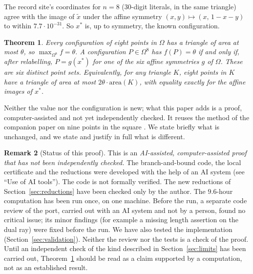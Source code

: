 \documentclass[11pt]{amsart}
\newtheorem{theorem}{Theorem}[section]
\theoremstyle{definition}
\newtheorem{remark}[theorem]{Remark}
\newcommand{\Om}{\Omega}
\begin{document}
The record site's coordinates for $n = 8$ (30-digit literals, in the same triangle) agree with the image of $\tilde x$ under the affine symmetry $(x,y)\mapsto(x,\,1-x-y)$ to within $7.7\cdot10^{-31}$. So $x^*$ is, up to symmetry, the known configuration. %

\begin{theorem}\label{thm:main}
Every configuration of eight points in $\Om$ has a triangle of area at most $\theta$, so $\max_{\Om^8} f = \theta$. A configuration $P \in \Om^8$ has $f(P) = \theta$ if and only if, after relabelling, $P = g(x^*)$ for one of the six affine symmetries $g$ of $\Om$. These are six distinct point sets. Equivalently, for any triangle $K$, eight points in $K$ have a triangle of area at most $2\theta\cdot\mathrm{area}(K)$, with equality exactly for the affine images of $x^*$.
\end{theorem}

Neither the value nor the configuration is new; what this paper adds is a proof, computer-assisted and not yet independently checked. It reuses the method of the companion paper on nine points in the square \cite{N9}. We state briefly what is unchanged, and we state and justify in full what is different.

\begin{remark}[Status of this proof]\label{rem:status}
This is an \emph{AI-assisted, computer-assisted proof that has not been independently checked.} The branch-and-bound code, the local certificate and the reductions were developed with the help of an AI system (see ``Use of AI tools''). The code is not formally verified. The new reductions of Section~\ref{sec:reductions} have been checked only by the author. The $9.6$-hour computation has been run once, on one machine. Before the run, a separate code review of the port, carried out with an AI system and not by a person, found no critical issue; its minor findings (for example a missing length assertion on the dual ray) were fixed before the run. We have also tested the implementation (Section~\ref{sec:validation}). Neither the review nor the tests is a check of the proof. Until an independent check of the kind described in Section~\ref{sec:limits} has been carried out, Theorem~\ref{thm:main} should be read as a claim supported by a computation, not as an established result.
\end{remark}
\end{document}
